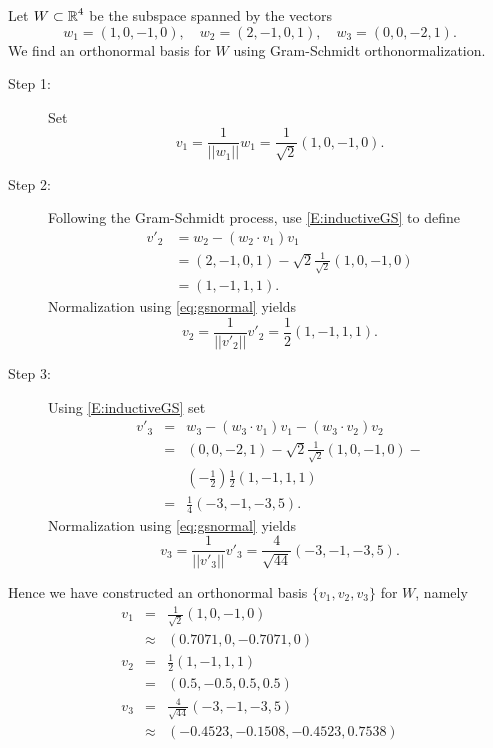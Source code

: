 \documentclass{ximera}
\begin{document}
Let $W\subset\mbox{$\Bbb{R}$}^4$ be the subspace spanned by the vectors
\begin{equation}  \label{eq:gsexam}
w_1=(1,0,-1,0),\quad w_2=(2,-1,0,1),\quad w_3=(0,0,-2,1).
\end{equation}
We find an orthonormal basis for $W$ using Gram-Schmidt orthonormalization.

\begin{description}
\item[Step 1:]   Set
\[
v_1 = \frac{1}{||w_1||}w_1=\frac{1}{\sqrt{2}}(1,0,-1,0).
\]
\item[Step 2:] Following the Gram-Schmidt process, use \eqref{E:inductiveGS} to
define
\begin{align*}
  v'_2 &= w_2-(w_2\cdot v_1)v_1 \\
  &= (2,-1,0,1)-\sqrt{2}\frac{1}{\sqrt{2}}(1,0,-1,0) \\
  &=(1,-1,1,1).
\end{align*}
Normalization using \eqref{eq:gsnormal} yields
\[
v_2 = \frac{1}{||v'_2||}v'_2 = \frac{1}{2}(1,-1,1,1).
\]
\item[Step 3:] Using \eqref{E:inductiveGS} set
\begin{eqnarray*}
v'_3 &=& w_3-(w_3\cdot v_1)v_1-(w_3\cdot v_2)v_2\\
     &=&(0,0,-2,1) - \sqrt{2}\frac{1}{\sqrt{2}}(1,0,-1,0) - \\
         & & \left(-\frac{1}{2}\right)\frac{1}{2}(1,-1,1,1)\\
&=&\frac{1}{4}(-3,-1,-3,5).
\end{eqnarray*}
Normalization using \eqref{eq:gsnormal} yields
\[
v_3 = \frac{1}{||v'_3||}v'_3 = \frac{4}{\sqrt{44}}(-3,-1,-3,5).
\]
\end{description}

Hence we have constructed an orthonormal basis $\{v_1,v_2,v_3\}$ for $W$,
namely
\begin{equation}
\label{eq:gsoresult}
\begin{array}{rcccl}
  v_1 & = & \frac{1}{\sqrt{2}}(1,0,-1,0) \\
      & \approx & (0.7071,0,-0.7071,0)\\
  v_2 & = & \frac{1}{2}(1,-1,1,1) \\
    & = & (0.5,-0.5,0.5,0.5)\\
  v_3 & = & \frac{4}{\sqrt{44}}(-3,-1,-3,5) \\
    & \approx & (-0.4523,-0.1508,-0.4523,0.7538)
\end{array}
\end{equation}
\end{document}

